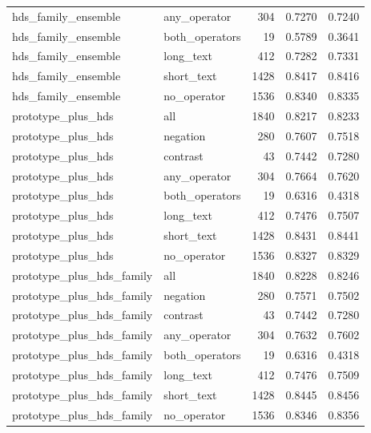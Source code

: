 \begin{tabular}{llrrr}
hds\_family\_ensemble & any\_operator & 304 & 0.7270 & 0.7240 \\
hds\_family\_ensemble & both\_operators & 19 & 0.5789 & 0.3641 \\
hds\_family\_ensemble & long\_text & 412 & 0.7282 & 0.7331 \\
hds\_family\_ensemble & short\_text & 1428 & 0.8417 & 0.8416 \\
hds\_family\_ensemble & no\_operator & 1536 & 0.8340 & 0.8335 \\
prototype\_plus\_hds & all & 1840 & 0.8217 & 0.8233 \\
prototype\_plus\_hds & negation & 280 & 0.7607 & 0.7518 \\
prototype\_plus\_hds & contrast & 43 & 0.7442 & 0.7280 \\
prototype\_plus\_hds & any\_operator & 304 & 0.7664 & 0.7620 \\
prototype\_plus\_hds & both\_operators & 19 & 0.6316 & 0.4318 \\
prototype\_plus\_hds & long\_text & 412 & 0.7476 & 0.7507 \\
prototype\_plus\_hds & short\_text & 1428 & 0.8431 & 0.8441 \\
prototype\_plus\_hds & no\_operator & 1536 & 0.8327 & 0.8329 \\
prototype\_plus\_hds\_family & all & 1840 & 0.8228 & 0.8246 \\
prototype\_plus\_hds\_family & negation & 280 & 0.7571 & 0.7502 \\
prototype\_plus\_hds\_family & contrast & 43 & 0.7442 & 0.7280 \\
prototype\_plus\_hds\_family & any\_operator & 304 & 0.7632 & 0.7602 \\
prototype\_plus\_hds\_family & both\_operators & 19 & 0.6316 & 0.4318 \\
prototype\_plus\_hds\_family & long\_text & 412 & 0.7476 & 0.7509 \\
prototype\_plus\_hds\_family & short\_text & 1428 & 0.8445 & 0.8456 \\
prototype\_plus\_hds\_family & no\_operator & 1536 & 0.8346 & 0.8356 \\
\bottomrule
\end{tabular}
